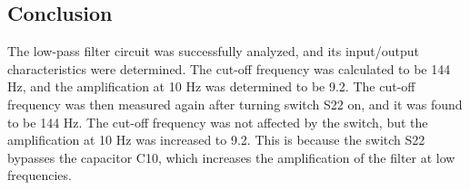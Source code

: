 \subsection{Conclusion}
The low-pass filter circuit was successfully analyzed, and its input/output characteristics were determined. The cut-off frequency was calculated to be 144 Hz, and the amplification at 10 Hz was determined to be 9.2. The cut-off frequency was then measured again after turning switch S22 on, and it was found to be 144 Hz. The cut-off frequency was not affected by the switch, but the amplification at 10 Hz was increased to 9.2. This is because the switch S22 bypasses the capacitor C10, which increases the amplification of the filter at low frequencies.